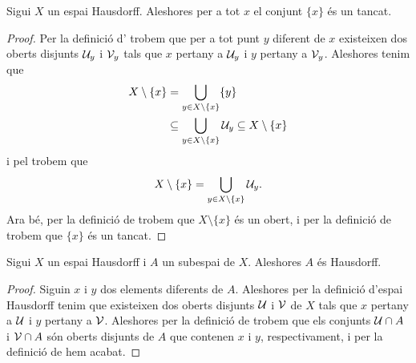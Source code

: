 \documentclass[../Apunts.tex]{subfiles}
\begin{document}
	\begin{proposition}
		\label{prop:els punts en un Hausdorff són tancats}
		Sigui \(X\) un espai Hausdorff. Aleshores per a tot \(x\) el conjunt \(\{x\}\) és un tancat.
		\begin{proof}
			Per la definició d' trobem que per a tot punt \(y\) diferent de \(x\) existeixen dos oberts disjunts \(\mathcal{U}_{y}\) i \(\mathcal{V}_{y}\) tals que \(x\) pertany a \(\mathcal{U}_{y}\) i \(y\) pertany a \(\mathcal{V}_{y}\). Aleshores tenim que
			\begin{align*}
				X\setminus\{x\}&=\bigcup_{y\in X\setminus\{x\}}\{y\} \\
				&\subseteq\bigcup_{y\in X\setminus\{x\}}\mathcal{U}_{y}\subseteq X\setminus\{x\}
			\end{align*}
			i pel  trobem que
			\[X\setminus\{x\}=\bigcup_{y\in X\setminus\{x\}}\mathcal{U}_{y}.\]
			Ara bé, per la definició de  trobem que \(X\setminus\{x\}\) és un obert, i per la definició de  trobem que \(\{x\}\) és un tancat.
		\end{proof}
	\end{proposition}
	\begin{proposition}
		\label{prop:els subespais d'un Hausdorff són Hausdorff}
		Sigui \(X\) un espai Hausdorff i \(A\) un subespai de \(X\). Aleshores \(A\) és Hausdorff.
		\begin{proof}
			Siguin \(x\) i \(y\) dos elements diferents de \(A\). Aleshores per la definició d'espai Hausdorff tenim que existeixen dos oberts disjunts \(\mathcal{U}\) i \(\mathcal{V}\) de \(X\) tals que \(x\) pertany a \(\mathcal{U}\) i \(y\) pertany a \(\mathcal{V}\). Aleshores per la definició de  trobem que els conjunts \(\mathcal{U}\cap A\) i \(\mathcal{V}\cap A\) són oberts disjunts de \(A\) que contenen \(x\) i \(y\), respectivament, i per la definició de  hem acabat.
		\end{proof}
	\end{proposition}
\end{document}
